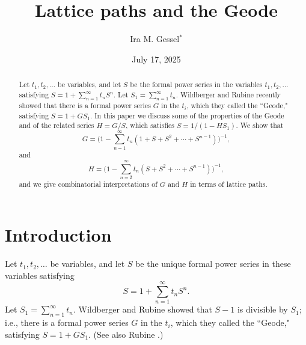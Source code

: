 \documentclass[12pt,reqno, oneside]{amsart}
\begin{document}
\title{Lattice paths and the Geode}
\author{Ira M. Gessel$^*$}
\address{Department of Mathematics\\
   Brandeis University\\
   Waltham, MA 02453}
\date{July 17, 2025}
\begin{abstract}

Let $t_1,t_2,\dots$ be variables, and  let $S$ be the  formal power series in the variables $t_1, t_2,\dots$ satisfying 
\begin{math}
S=1+\sum_{n=1}^\infty t_n S^n. 
\end{math}
Let $S_1 =\sum_{n=1}^\infty t_n$. Wildberger and Rubine recently showed that  there is a formal power series $G$ in the $t_i$, which they called the ``Geode," satisfying 
$S=1+GS_1$.
In this paper we discuss some of the properties of the Geode and of the related series $H=G/S$, which satisfies $S=1/(1-HS_1)$. We show that 
\begin{equation*}
G=\biggl(1-\sum_{n=1}^\infty t_n (1+S+S^2+\cdots+S^{n-1})\biggr)^{-1},
\end{equation*}
and
\begin{equation*}
H=\biggl( 1-\sum_{n=2}^\infty t_n (S+S^2+\cdots+S^{n-1})\biggr)^{-1},
\end{equation*}
and we give combinatorial interpretations of $G$ and $H$ in terms of lattice paths.
\end{abstract}


\maketitle

\thispagestyle{empty}
\section{Introduction}

Let $t_1, t_2,\dots$ be variables, and  let $S$ be the unique formal power series in these variables satisfying 
\begin{equation}
\label{e-S0}
S=1+\sum_{n=1}^\infty t_n S^n. 
\end{equation}
Let $S_1 =\sum_{n=1}^\infty t_n$. Wildberger and Rubine \cite[Theorem 12]{wr} showed that $S-1$ is divisible by $S_1$; i.e., there is a formal power series $G$ in the $t_i$, which they called the ``Geode," satisfying 
$S=1+GS_1$. (See also Rubine \cite{rubine}.)
\end{document}
